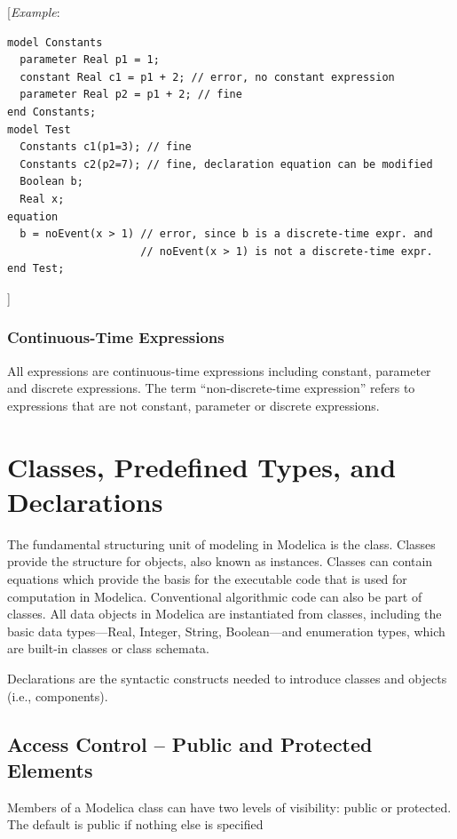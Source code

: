 \documentclass[10pt,a4paper]{report}
\def\doublelabel#1{\label{#1}}
\begin{document}
{[}\emph{Example}:
\begin{lstlisting}[language=modelica]
model Constants
  parameter Real p1 = 1;
  constant Real c1 = p1 + 2; // error, no constant expression
  parameter Real p2 = p1 + 2; // fine
end Constants;
model Test
  Constants c1(p1=3); // fine
  Constants c2(p2=7); // fine, declaration equation can be modified
  Boolean b;
  Real x;
equation
  b = noEvent(x > 1) // error, since b is a discrete-time expr. and
                     // noEvent(x > 1) is not a discrete-time expr.
end Test;
\end{lstlisting}

{]}

\subsection{Continuous-Time Expressions}\doublelabel{continuous-time-expressions}

All expressions are continuous-time expressions including constant,
parameter and discrete expressions. The term ``non-discrete-time
expression'' refers to expressions that are not constant, parameter or
discrete expressions.

\chapter{Classes, Predefined Types, and Declarations}\doublelabel{class-predefined-types-and-declarations}

The fundamental structuring unit of modeling in Modelica is the class.
Classes provide the structure for objects, also known as instances.
Classes can contain equations which provide the basis for the executable
code that is used for computation in Modelica. Conventional algorithmic
code can also be part of classes. All data objects in Modelica are
instantiated from classes, including the basic data types---Real,
Integer, String, Boolean---and enumeration types, which are built-in
classes or class schemata.

Declarations are the syntactic constructs needed to introduce classes
and objects (i.e., components).

\section{Access Control -- Public and Protected Elements}\doublelabel{access-control-public-and-protected-elements}

Members of a Modelica class can have two levels of visibility: public or
protected. The default is public if nothing else is specified
\end{document}
